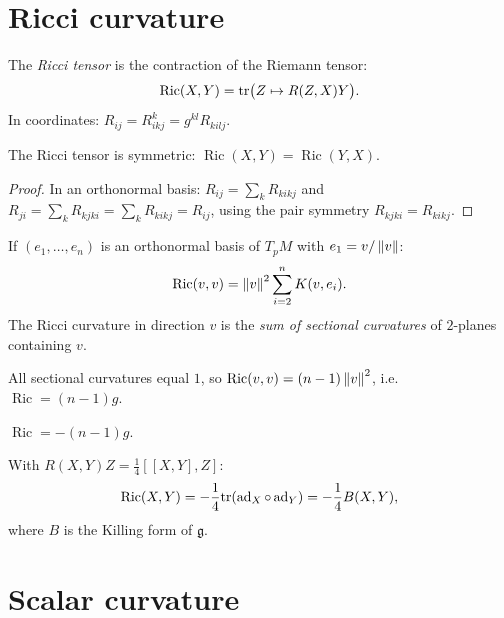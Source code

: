 \section{Ricci curvature}

\begin{definition}
The \emph{Ricci tensor} is the contraction of the Riemann tensor:
\[
    \operatorname{Ric}(X, Y) = \mathrm{tr}\big(Z \mapsto R(Z, X)Y\big).
\]
In coordinates: $R_{ij} = R^k_{ikj} = g^{kl} R_{kilj}$.
\end{definition}

\begin{proposition}
The Ricci tensor is symmetric: $\operatorname{Ric}(X,Y) = \operatorname{Ric}(Y,X)$.
\end{proposition}

\begin{proof}
In an orthonormal basis:
$R_{ij} = \sum_k R_{kikj}$ and $R_{ji} = \sum_k R_{kjki} = \sum_k R_{kikj} = R_{ij}$,
using the pair symmetry $R_{kjki} = R_{kikj}$.
\end{proof}

\begin{proposition}
If $(e_1, \ldots, e_n)$ is an orthonormal basis of $T_pM$ with $e_1 = v/\left\| v \right\|$:
\[
    \operatorname{Ric}(v, v) = \left\| v \right\|^2 \sum_{i=2}^n K(v, e_i).
\]
The Ricci curvature in direction $v$ is the \emph{sum of sectional curvatures}
of $2$-planes containing $v$.
\end{proposition}

\begin{example}[Ricci of $S^n$]
All sectional curvatures equal $1$, so
$\operatorname{Ric}(v,v) = (n-1)\left\| v \right\|^2$, i.e.\ $\operatorname{Ric} = (n-1)g$.
\end{example}

\begin{example}
$\operatorname{Ric} = -(n-1)g$.
\end{example}

\begin{example}
With $R(X,Y)Z = \frac{1}{4}[[X,Y],Z]$:
\[
    \operatorname{Ric}(X,Y) = -\frac{1}{4}\mathrm{tr}(\operatorname{ad}_X \circ \operatorname{ad}_Y)
    = -\frac{1}{4}B(X,Y),
\]
where $B$ is the Killing form of $\mathfrak{g}$.
\end{example}

\section{Scalar curvature}

